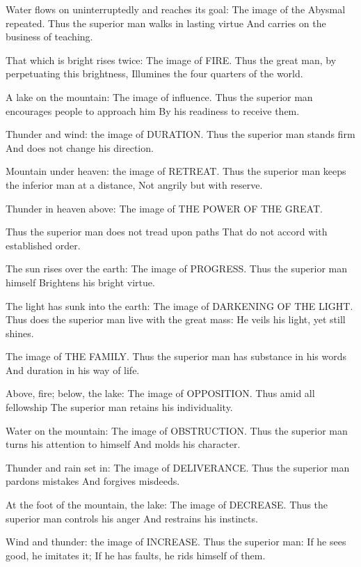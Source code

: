 {Water flows on uninterruptedly and reaches its goal:
 The image of the Abysmal repeated.
 Thus the superior man walks in lasting virtue
 And carries on the business of teaching.}

{That which is bright rises twice:
 The image of FIRE.
 Thus the great man, by perpetuating this brightness,
 Illumines the four quarters of the world.}

{A lake on the mountain:
 The image of influence.
 Thus the superior man encourages people to approach him
 By his readiness to receive them.}

{Thunder and wind: the image of
 DURATION.
 Thus the superior man stands firm
 And does not change his direction.}

{Mountain under heaven: the image of
 RETREAT.
 Thus the superior man keeps the inferior man at a distance,
 Not angrily but with reserve.}

{Thunder in heaven above:
 The image of THE POWER OF THE
 GREAT.}

{Thus the superior man does not tread upon paths
 That do not accord with established order.}

{The sun rises over the earth:
 The image of PROGRESS.
 Thus the superior man himself
 Brightens his bright virtue.}

{The light has sunk into the earth:
 The image of DARKENING OF THE LIGHT.
 Thus does the superior man live with the great mass:
 He veils his light, yet still shines.}

{The image of THE FAMILY.
 Thus the superior man has substance in his words
 And duration in his way of life.}

{Above, fire; below, the lake:
 The image of OPPOSITION.
 Thus amid all fellowship
 The superior man retains his individuality.}

{Water on the mountain:
 The image of OBSTRUCTION.
 Thus the superior man turns his attention to himself
 And molds his character.}

{Thunder and rain set in:
 The image of DELIVERANCE.
 Thus the superior man pardons mistakes
 And forgives misdeeds.}

{At the foot of the mountain, the lake:
 The image of DECREASE.
 Thus the superior man controls his anger
 And restrains his instincts.}

{Wind and thunder: the image of
 INCREASE.
 Thus the superior man:
 If he sees good, he imitates it;
 If he has faults, he rids himself of them.}

